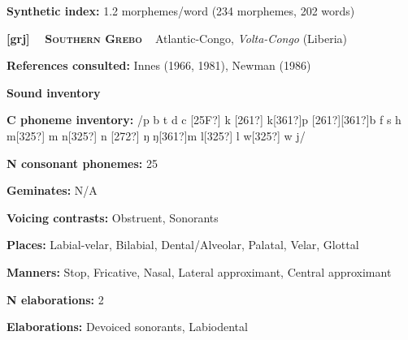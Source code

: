 \begin{styleBody}
\textbf{Synthetic index: }1.2 morphemes/word (234 morphemes, 202 words)
\end{styleBody}

\clearpage\begin{styleBody}
\textbf{[grj] }\ \ \textbf{\textsc{Southern Grebo}}\textbf{\ \ }Atlantic-Congo, \textit{Volta-Congo }(Liberia)
\end{styleBody}

\begin{styleBody}
\textbf{References consulted: }Innes (1966, 1981), Newman (1986)
\end{styleBody}

\begin{styleBody}
\textbf{Sound inventory}
\end{styleBody}

\begin{styleBody}
\textbf{C phoneme inventory:} /p b t d c [25F?] k [261?] k[361?]p [261?][361?]b f s h m[325?] m n[325?] n [272?] ŋ ŋ[361?]m l[325?] l w[325?] w j/
\end{styleBody}

\begin{styleBody}
\textbf{N consonant phonemes:} 25
\end{styleBody}

\begin{styleBody}
\textbf{Geminates:} N/A
\end{styleBody}

\begin{styleBody}
\textbf{Voicing contrasts:} Obstruent, Sonorants
\end{styleBody}

\begin{styleBody}
\textbf{Places:} Labial-velar, Bilabial, Dental/Alveolar, Palatal, Velar, Glottal
\end{styleBody}

\begin{styleBody}
\textbf{Manners:} Stop, Fricative, Nasal, Lateral approximant, Central approximant
\end{styleBody}

\begin{styleBody}
\textbf{N elaborations: }2
\end{styleBody}

\begin{styleBody}
\textbf{Elaborations:} Devoiced sonorants, Labiodental
\end{styleBody}

